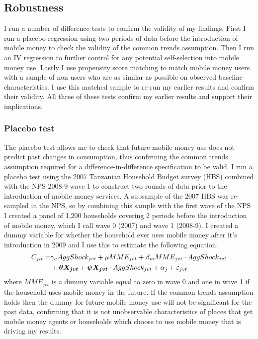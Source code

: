 
\subsection{Robustness}
I run a number of difference tests to confirm the validity of my findings. First I run a placebo regression using two periods of data before the introduction of mobile money to check the validity of the common trends assumption. Then I run an IV regression to further control for any potential self-selection into mobile money use. Lastly I use propensity score matching to match mobile money users with a sample of non users who are as similar as possible on observed baseline characteristics. I use this matched sample to re-run my earlier results and  confirm their validity. All three of these tests confirm my earlier results and support their implications.   

\subsubsection{Placebo test}
The placebo test allows me to check that future mobile money use does not predict past changes in consumption, thus confirming the common trends assumption required for a difference-in-difference specification to be valid. I run a placebo test using the 2007 Tanzanian Household Budget survey (HBS) combined with the NPS 2008-9 wave 1  to construct two rounds of data prior to the introduction of mobile money services. A subsample of the 2007 HBS was re-sampled in the NPS, so by combining this sample with the first wave of the NPS I created a panel of 1,200 households covering 2 periods before the introduction of mobile money, which I call wave 0 (2007) and wave 1 (2008-9). I created a dummy variable for whether the household ever uses mobile money after it's introduction in 2009 and I use this to estimate the following equation: 
\begin{align} \label{eq: placebo}
C_{jit} = &  \gamma_a AggShock_{jvt} + \mu MME_{jvt}      + \beta_m MME_{jvt}\cdot AggShock_{jvt}  \notag \\
& + \bm{\theta X_{jvt}} +  \bm{\psi X_{jvt}} \cdot AggShock_{jvt} +  \alpha_j + \varepsilon_{jvt} 
\end{align}
where $MME_{jvt}$ is a dummy variable equal to zero in wave 0 and one in wave 1 if the household uses mobile money in the future. If the common trends assumption holds then the dummy for future mobile money use will not be significant for the past data, confirming that it is not unobservable characteristics of places that get mobile money agents or households which choose to use mobile money that is driving my results. 

